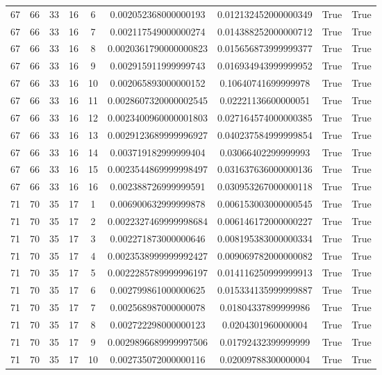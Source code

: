 \documentclass[a4paper,11pt]{article}
\begin{document}
\begin{landscape}
\begin{longtable}{ccccccccc}
67 & 66 & 33 & 16 & 6 & 0.002052368000000193 & 0.012132452000000349 & True & True \\
67 & 66 & 33 & 16 & 7 & 0.002117549000000274 & 0.014388252000000712 & True & True \\
67 & 66 & 33 & 16 & 8 & 0.0020361790000000823 & 0.015656873999999377 & True & True \\
67 & 66 & 33 & 16 & 9 & 0.002915911999999743 & 0.016934943999999952 & True & True \\
67 & 66 & 33 & 16 & 10 & 0.002065893000000152 & 0.10640741699999978 & True & True \\
67 & 66 & 33 & 16 & 11 & 0.0028607320000002545 & 0.02221136600000051 & True & True \\
67 & 66 & 33 & 16 & 12 & 0.0023400960000001803 & 0.027164574000000385 & True & True \\
67 & 66 & 33 & 16 & 13 & 0.0029123689999996927 & 0.040237584999999854 & True & True \\
67 & 66 & 33 & 16 & 14 & 0.003719182999999404 & 0.03066402299999993 & True & True \\
67 & 66 & 33 & 16 & 15 & 0.0023544869999998497 & 0.031637636000000136 & True & True \\
67 & 66 & 33 & 16 & 16 & 0.002388726999999591 & 0.030953267000000118 & True & True \\
71 & 70 & 35 & 17 & 1 & 0.006900632999999878 & 0.006153003000000545 & True & True \\
71 & 70 & 35 & 17 & 2 & 0.0022327469999998684 & 0.006146172000000227 & True & True \\
71 & 70 & 35 & 17 & 3 & 0.002271873000000646 & 0.008195383000000334 & True & True \\
71 & 70 & 35 & 17 & 4 & 0.0023538999999992427 & 0.009069782000000082 & True & True \\
71 & 70 & 35 & 17 & 5 & 0.0022285789999996197 & 0.014116250999999913 & True & True \\
71 & 70 & 35 & 17 & 6 & 0.002799861000000625 & 0.015334135999999887 & True & True \\
71 & 70 & 35 & 17 & 7 & 0.002568987000000078 & 0.01804337899999986 & True & True \\
71 & 70 & 35 & 17 & 8 & 0.002722298000000123 & 0.0204301960000004 & True & True \\
71 & 70 & 35 & 17 & 9 & 0.0029896689999997506 & 0.01792432399999999 & True & True \\
71 & 70 & 35 & 17 & 10 & 0.002735072000000116 & 0.02009788300000004 & True & True \\

\end{longtable}
\end{landscape}
\end{document}
